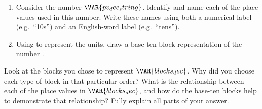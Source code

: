 
\begin{enumerate}
    \item Consider the number $\VAR{pv_dec_string}$. Identify and name each of the place values used in this number. Write these names using both a numerical label (e.g.\ ``10s'') and an English-word label (e.g.\ ``tens'').

    \vfill
    \begin{ansenv}
    \end{ansenv}
    \vfill

    \item Using  to represent the units, draw a base-ten block representation of the number .

    \vfill
    \begin{ansenv}
    \end{ansenv}
    \vfill
\end{enumerate}

\newpage


Look at the blocks you chose to represent $\VAR{blocks_dec}$. Why did you choose each type of block in that particular order? What is the relationship between each of the place values in $\VAR{blocks_dec}$, and how do the base-ten blocks help to demonstrate that relationship? Fully explain all parts of your answer.